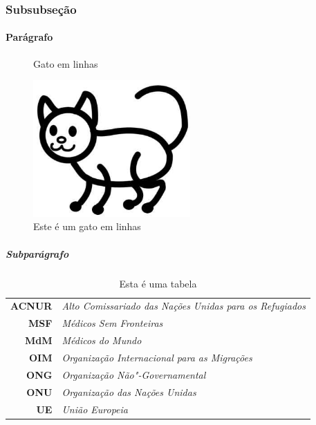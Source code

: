 \documentclass{memoir}
\begin{document}
\subsubsection{Subsubseção}
\lipsum[3]

\paragraph{Parágrafo}
\lipsum[4]

\begin{figure}[t]
\caption{Gato em linhas}
\includegraphics[width=6cm]{cat.jpg}
\caption{Este é um gato em linhas}
\end{figure}

\subparagraph{Subparágrafo}
\lipsum[5]


\begin{table}[b]
\centering
\caption{Esta é uma tabela}
\label{my-label}
\begin{tabular}{rl}
\rowcolor[HTML]{ECF4FF} 
\textbf{ACNUR} & \textit{Alto Comissariado das Nações Unidas para os Refugiados} \\
\textbf{MSF}   & \textit{Médicos Sem Fronteiras}                                 \\
\rowcolor[HTML]{ECF4FF} 
\textbf{MdM}   & \textit{Médicos do Mundo}                                       \\
\textbf{OIM}   & \textit{Organização Internacional para as Migrações}            \\
\rowcolor[HTML]{ECF4FF} 
\textbf{ONG}   & \textit{Organização Não"-Governamental}                         \\
\textbf{ONU}   & \textit{Organização das Nações Unidas}                          \\
\rowcolor[HTML]{ECF4FF} 
\textbf{UE}    & \textit{União Europeia}                                        
\end{tabular}
\end{table}


\lipsum

\noindent\dotfill\par

\end{document}
